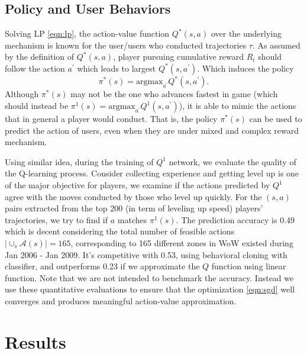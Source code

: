 \documentclass{sigchi}
\begin{document}
\subsection{Policy and User Behaviors}

Solving LP \eqref{eqn:lp}, the action-value function $Q^\ast(s,a)$ over the underlying mechanism is known for the user/users who conducted trajectories $\tau$.
As assumed by the definition of $Q^\ast(s,a)$, player pursuing cumulative reward $R_t$ should follow the action $a^\prime$ which leads to largest $Q^\ast(s,a^\prime)$.
Which induces the policy
\begin{equation}
\pi^\ast(s) = \text{argmax}_{a^\prime}Q^\ast(s,a^\prime).
\label{eqn:policy}
\end{equation}
Although $\pi^\ast(s)$ may not be the one who advances fastest in game (which should instead be $\pi^1(s) = \text{argmax}_{a^\prime}Q^1(s,a^\prime)$), it is able to mimic the actions that in general a player would conduct. 
That is, the policy $\pi^\ast(s)$ can be used to predict the action of users, even when they are under mixed and complex reward mechanism.

Using similar idea, during the training of $Q^1$ network, we evaluate the quality of the Q-learning process.
Consider collecting experience and getting level up is one of the major objective for players, we examine if the actions predicted by $Q^1$ agree with the moves conducted by those who level up quickly. 
For the $(s,a)$ pairs extracted from the top 200 (in term of leveling up speed) players' trajectories, we try to find if $a$ matches $\pi^1(s)$. 
The prediction accuracy is 0.49 which is decent considering the total number of feasible actions $|\cup_s\mathcal{A}(s)|=165$, corresponding to 165 different zones in WoW existed during Jan 2006 - Jan 2009. 
It's competitive with 0.53, using behavioral cloning \cite{amit2002parametric,sammut1992learning} with classifier, and outperforms 0.23 if we approximate the $Q$ function using linear function. 
Note that we are not intended to benchmark the accuracy.
Instead we use these quantitative evaluations to ensure that the optimization \ref{eqn:sgd} well converges and produces meaningful action-value approximation.

\section{Results}
\end{document}
